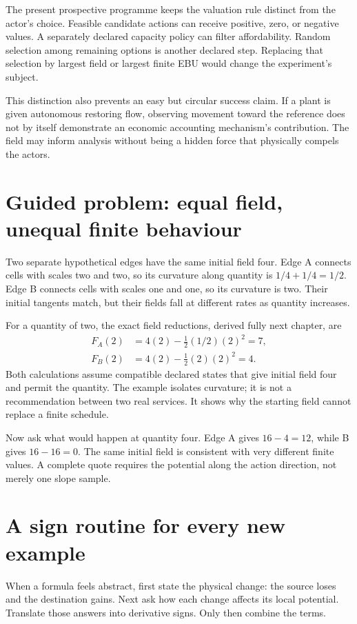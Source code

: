 The present prospective programme keeps the valuation rule distinct from the actor's choice. Feasible candidate actions can receive positive, zero, or negative values. A separately declared capacity policy can filter affordability. Random selection among remaining options is another declared step. Replacing that selection by largest field or largest finite EBU would change the experiment's subject.

This distinction also prevents an easy but circular success claim. If a plant is given autonomous restoring flow, observing movement toward the reference does not by itself demonstrate an economic accounting mechanism's contribution. The field may inform analysis without being a hidden force that physically compels the actors.

\section{Guided problem: equal field, unequal finite behaviour}
Two separate hypothetical edges have the same initial field four. Edge A connects cells with scales two and two, so its curvature along quantity is \(1/4+1/4=1/2\). Edge B connects cells with scales one and one, so its curvature is two. Their initial tangents match, but their fields fall at different rates as quantity increases.

For a quantity of two, the exact field reductions, derived fully next chapter, are
\begin{align}
 F_A(2)&=4(2)-\tfrac12(1/2)(2)^2=7,\\
 F_B(2)&=4(2)-\tfrac12(2)(2)^2=4.
\end{align}
Both calculations assume compatible declared states that give initial field four and permit the quantity. The example isolates curvature; it is not a recommendation between two real services. It shows why the starting field cannot replace a finite schedule.

Now ask what would happen at quantity four. Edge A gives \(16-4=12\), while B gives \(16-16=0\). The same initial field is consistent with very different finite values. A complete quote requires the potential along the action direction, not merely one slope sample.

\section{A sign routine for every new example}
When a formula feels abstract, first state the physical change: the source loses and the destination gains. Next ask how each change affects its local potential. Translate those answers into derivative signs. Only then combine the terms.

